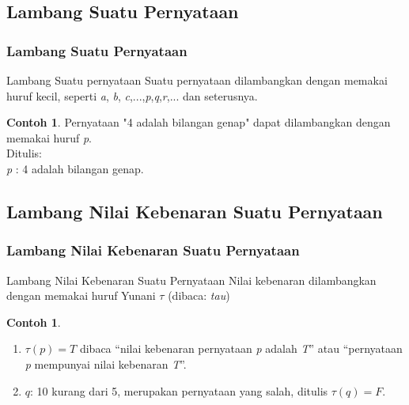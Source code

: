 \documentclass[handout]{beamer}
\theoremstyle{definition}
\theoremstyle{example}
\newtheorem{contoh}[theorem]{Contoh}
\begin{document}
\subsection{Lambang Suatu Pernyataan}
\begin{frame}
\frametitle{Lambang Suatu Pernyataan}

\begin{block}{Lambang Suatu pernyataan}
 Suatu pernyataan dilambangkan dengan memakai huruf kecil, seperti \textit{a}, \textit{b}, \textit{c},...,\textit{p},\textit{q},\textit{r},... dan seterusnya.
\end{block}

\begin{contoh}
	Pernyataan "4 adalah bilangan genap" dapat dilambangkan dengan memakai huruf \textit{p}.\\
	Ditulis:\\
	\textit{p} :  4 adalah bilangan genap.
\end{contoh}
\end{frame}

\subsection{Lambang Nilai Kebenaran Suatu Pernyataan}
\begin{frame}
\frametitle{Lambang Nilai Kebenaran Suatu Pernyataan}
\begin{block}{Lambang Nilai Kebenaran Suatu Pernyataan}
Nilai kebenaran dilambangkan dengan memakai huruf Yunani $\tau$ (dibaca: \textit{tau})
\end{block}
  \begin{contoh}
  	\begin{enumerate}
	 \item $\tau(\textit{p}) = T$ dibaca “nilai kebenaran pernyataan \textit{p} adalah \textit{T}” atau “pernyataan \textit{p} mempunyai nilai kebenaran \textit{T}”.
	\item $\textit{q}$: 10 kurang dari 5, merupakan pernyataan yang salah, ditulis $\tau(\textit{q}) = F$.
    \end{enumerate}
  \end{contoh}
\end{frame}
\end{document}
